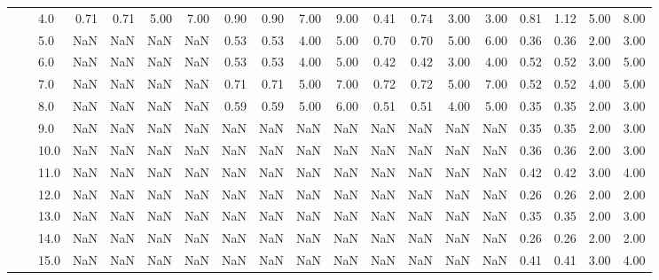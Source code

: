 \begin{tabular}{lllrrrrrrrrrrrrrrrr}
     &     & 4.0  &       0.71 &      0.71 &  5.00 &   7.00 &       0.90 &      0.90 &  7.00 &   9.00 &       0.41 &      0.74 &  3.00 &   3.00 &       0.81 &      1.12 & 5.00 &   8.00 \\
     &     & 5.0  &        NaN &       NaN &   NaN &    NaN &       0.53 &      0.53 &  4.00 &   5.00 &       0.70 &      0.70 &  5.00 &   6.00 &       0.36 &      0.36 & 2.00 &   3.00 \\
     &     & 6.0  &        NaN &       NaN &   NaN &    NaN &       0.53 &      0.53 &  4.00 &   5.00 &       0.42 &      0.42 &  3.00 &   4.00 &       0.52 &      0.52 & 3.00 &   5.00 \\
     &     & 7.0  &        NaN &       NaN &   NaN &    NaN &       0.71 &      0.71 &  5.00 &   7.00 &       0.72 &      0.72 &  5.00 &   7.00 &       0.52 &      0.52 & 4.00 &   5.00 \\
     &     & 8.0  &        NaN &       NaN &   NaN &    NaN &       0.59 &      0.59 &  5.00 &   6.00 &       0.51 &      0.51 &  4.00 &   5.00 &       0.35 &      0.35 & 2.00 &   3.00 \\
     &     & 9.0  &        NaN &       NaN &   NaN &    NaN &        NaN &       NaN &   NaN &    NaN &        NaN &       NaN &   NaN &    NaN &       0.35 &      0.35 & 2.00 &   3.00 \\
     &     & 10.0 &        NaN &       NaN &   NaN &    NaN &        NaN &       NaN &   NaN &    NaN &        NaN &       NaN &   NaN &    NaN &       0.36 &      0.36 & 2.00 &   3.00 \\
     &     & 11.0 &        NaN &       NaN &   NaN &    NaN &        NaN &       NaN &   NaN &    NaN &        NaN &       NaN &   NaN &    NaN &       0.42 &      0.42 & 3.00 &   4.00 \\
     &     & 12.0 &        NaN &       NaN &   NaN &    NaN &        NaN &       NaN &   NaN &    NaN &        NaN &       NaN &   NaN &    NaN &       0.26 &      0.26 & 2.00 &   2.00 \\
     &     & 13.0 &        NaN &       NaN &   NaN &    NaN &        NaN &       NaN &   NaN &    NaN &        NaN &       NaN &   NaN &    NaN &       0.35 &      0.35 & 2.00 &   3.00 \\
     &     & 14.0 &        NaN &       NaN &   NaN &    NaN &        NaN &       NaN &   NaN &    NaN &        NaN &       NaN &   NaN &    NaN &       0.26 &      0.26 & 2.00 &   2.00 \\
     &     & 15.0 &        NaN &       NaN &   NaN &    NaN &        NaN &       NaN &   NaN &    NaN &        NaN &       NaN &   NaN &    NaN &       0.41 &      0.41 & 3.00 &   4.00 \\

\end{tabular}
